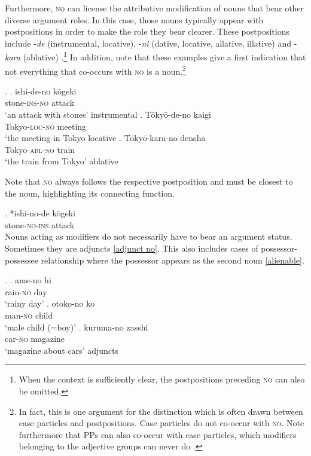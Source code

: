 \largerpage
Furthermore, \textsc{no} can license the attributive modification of nouns that bear other diverse argument roles. In this case, those nouns typically appear with postpositions in order to make the role they bear clearer. These postpositions include -\textit{de} (instrumental, locative), -\textit{ni} (dative, locative, allative, illative) and -\textit{kara} (ablative) \citep{murasugi:1991:noun,saito:2008:N}.\footnote{When the context is sufficiently clear, the postpositions preceding \textsc{no} can also be omitted.} In addition, note that these examples give a first indication that not everything that co-occurs with \textsc{no} is a noun.\footnote{In fact, this is one argument for the distinction which is often drawn between case particles and postpositions. Case particles do not co-occur with \textsc{no}. Note furthermore that PPs can also co-occur with case particles, which modifiers belonging to the adjective groups can never do \citep{murasugi:1991:noun, urushibara:1993:syntactic}.}

 \ex. \label{no with case} \ag. ishi-de-no kōgeki\\
stone-\textsc{ins-no} attack\\
`an attack with stones' \null \hfill instrumental \citep[248]{saito:2008:N}
\bg. Tōkyō-de-no kaigi\\
Tokyo-\textsc{loc-no} meeting\\
`the meeting in Tokyo \null \hfill locative
\cg. Tōkyō-kara-no densha\\
Tokyo-\textsc{abl-no} train\\
`the train from Tokyo' \null \hfill ablative \citep[50]{murasugi:1991:noun}

Note that \textsc{no} always follows the respective postposition and must be closest to the noun, highlighting its connecting function.

\exg. *ishi-no-de kōgeki\\
stone-\textsc{no-ins} attack\\

Nouns acting as modifiers do not necessarily have to bear an argument status. Sometimes they are adjuncts \ref{adjunct no}. This also includes cases of possessor-possessee relationship where the possessor appears as the second noun \ref{alienable}.

 \ex. \label{adjunct no} \ag. ame-no hi\\
rain-\textsc{no} day\\
`rainy day' \null \hfill \citep[251]{saito:2008:N}
\cg. otoko-no ko\\
man-\textsc{no} child\\
`male child (=boy)'
\cg. kuruma-no zasshi\\
car-\textsc{no} magazine\\
`magazine about cars' \null \hfill adjuncts


